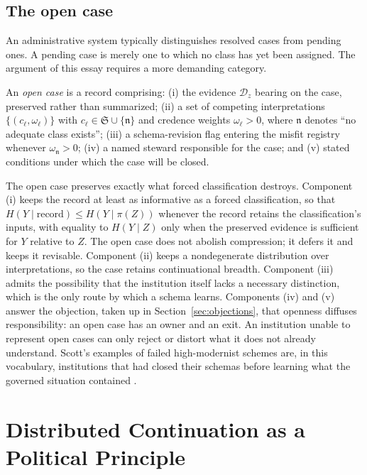 \subsection{The open case}

An administrative system typically distinguishes resolved cases from pending ones. A pending case is merely one to which no class has yet been assigned. The argument of this essay requires a more demanding category.

\begin{definition}
An \emph{open case} is a record comprising: (i) the evidence $\mathcal{D}_z$ bearing on the case, preserved rather than summarized; (ii) a set of competing interpretations $\{(c_\ell,\omega_\ell)\}$ with $c_\ell\in\mathfrak{S}\cup\{\mathfrak{n}\}$ and credence weights $\omega_\ell>0$, where $\mathfrak{n}$ denotes ``no adequate class exists''; (iii) a schema-revision flag entering the misfit registry whenever $\omega_{\mathfrak{n}}>0$; (iv) a named steward responsible for the case; and (v) stated conditions under which the case will be closed.
\end{definition}

The open case preserves exactly what forced classification destroys. Component (i) keeps the record at least as informative as a forced classification, so that $H(Y\mid\text{record})\leq H(Y\mid\pi(Z))$ whenever the record retains the classification's inputs, with equality to $H(Y\mid Z)$ only when the preserved evidence is sufficient for $Y$ relative to $Z$. The open case does not abolish compression; it defers it and keeps it revisable. Component (ii) keeps a nondegenerate distribution over interpretations, so the case retains continuational breadth. Component (iii) admits the possibility that the institution itself lacks a necessary distinction, which is the only route by which a schema learns. Components (iv) and (v) answer the objection, taken up in Section~\ref{sec:objections}, that openness diffuses responsibility: an open case has an owner and an exit. An institution unable to represent open cases can only reject or distort what it does not already understand. Scott's examples of failed high-modernist schemes are, in this vocabulary, institutions that had closed their schemas before learning what the governed situation contained \cite{scott1998}.

\section{Distributed Continuation as a Political Principle}\label{sec:political}

